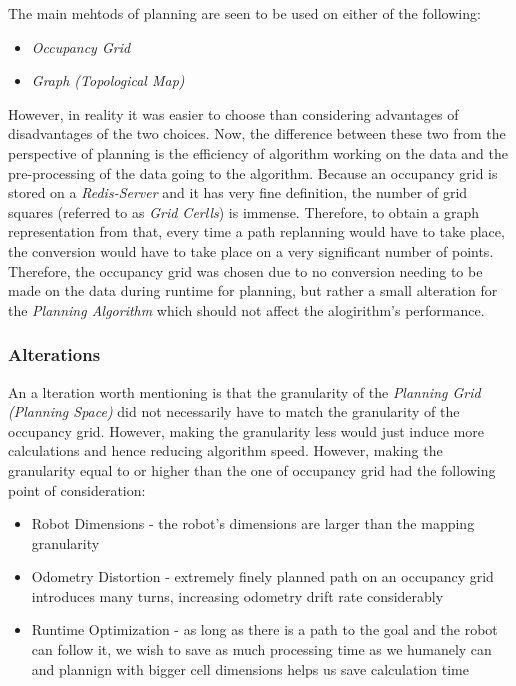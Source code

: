 \documentclass[11pt, a4paper]{article}
\begin{document}
The main mehtods\cite{path_space} of planning are seen to be used on either of the following:

\begin{itemize}
	\item \textit{Occupancy Grid}
	\item \textit{Graph (Topological Map)}
\end{itemize}

However, in reality it was easier to choose than considering advantages of disadvantages of the two choices. Now, the difference between these two from the perspective of planning is the efficiency of algorithm working on the data and the pre-processing of the data going to the algorithm. Because an occupancy grid is stored on a \textit{Redis-Server} and it has very fine definition, the number of grid squares (referred to as \textit{Grid Cerlls}) is immense. Therefore, to obtain a graph representation from that, every time a path replanning would have to take place, the conversion would have to take place on a very significant number of points. Therefore, the occupancy grid was chosen due to no conversion needing to be made on the data during runtime for planning, but rather a small alteration for the \textit{Planning Algorithm} which should not affect the alogirithm's performance.

\subsubsection{Alterations}

An a lteration worth mentioning is that the granularity of the \textit{Planning Grid (Planning Space)} did not necessarily have to match the granularity of the occupancy grid. However, making the granularity less would just induce more calculations and hence reducing algorithm speed. However,  making the granularity equal to or higher than the one of occupancy grid had the following point of consideration:

\begin{itemize}

	\item Robot Dimensions     - the robot's dimensions are larger than the mapping granularity
	\item Odometry Distortion  - extremely finely planned path on an occupancy grid introduces many turns, increasing odometry drift rate considerably \cite{task2_report}
	\item Runtime Optimization - as long as there is a path to the goal and the robot can follow it, we wish to save as much processing time as we humanely can and plannign with bigger cell dimensions helps us save calculation time

\end{itemize}
\end{document}
